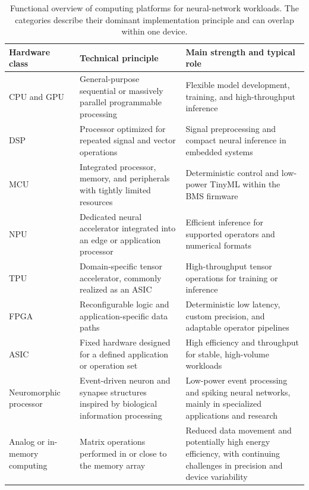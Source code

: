 \documentclass[
    a4paper,
    12pt,
    titlepage,
    bibliography=totoc,
    twoside=on,
    parskip=false,
    numbers=noenddot,
    cleardoublepage=empty,
    DIV=12,
    BCOR=12.0mm,
    headheight=36pt,
    headings=openright
]{scrreprt}
\begin{document}
\begin{table}[tbp]
    \centering
    \caption{Functional overview of computing platforms for neural-network workloads. The categories describe their dominant implementation principle and can overlap within one device.}
    \label{tab:neural_hardware_landscape}
    \small
    \renewcommand{\arraystretch}{1.12}
    \begin{tabularx}{\textwidth}{@{}p{2.9cm} X X@{}}
        \toprule
        Hardware class & Technical principle & Main strength and typical role \\
        \midrule
        CPU and GPU & General-purpose sequential or massively parallel programmable processing & Flexible model development, training, and high-throughput inference \\
        DSP & Processor optimized for repeated signal and vector operations & Signal preprocessing and compact neural inference in embedded systems \\
        MCU & Integrated processor, memory, and peripherals with tightly limited resources & Deterministic control and low-power TinyML within the BMS firmware \\
        NPU & Dedicated neural accelerator integrated into an edge or application processor & Efficient inference for supported operators and numerical formats \\
        TPU & Domain-specific tensor accelerator, commonly realized as an ASIC & High-throughput tensor operations for training or inference \\
        FPGA & Reconfigurable logic and application-specific data paths & Deterministic low latency, custom precision, and adaptable operator pipelines \\
        ASIC & Fixed hardware designed for a defined application or operation set & High efficiency and throughput for stable, high-volume workloads \\
        Neuromorphic processor & Event-driven neuron and synapse structures inspired by biological information processing & Low-power event processing and spiking neural networks, mainly in specialized applications and research \\
        Analog or in-memory computing & Matrix operations performed in or close to the memory array & Reduced data movement and potentially high energy efficiency, with continuing challenges in precision and device variability \\
        \bottomrule
    \end{tabularx}
\end{table}
\end{document}
